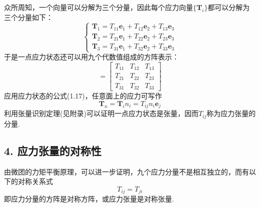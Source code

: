 众所周知，一个向量可以分解为三个分量，因此每个应力向量$\{\boldsymbol{T}_i\}$都可以分解为三个分量如下：
\begin{equation*}
\begin{cases}
\boldsymbol{T}_1=T_{11}\boldsymbol{e}_1+T_{12}\boldsymbol{e}_2+T_{13}\boldsymbol{e}_3\\
\boldsymbol{T}_2=T_{21}\boldsymbol{e}_1+T_{22}\boldsymbol{e}_2+T_{23}\boldsymbol{e}_3\\
\boldsymbol{T}_3=T_{31}\boldsymbol{e}_1+T_{32}\boldsymbol{e}_2+T_{33}\boldsymbol{e}_3
\end{cases}
\tag{1.17}
\end{equation*}
于是一点应力状态还可以用九个代数值组成的方阵表示：
\begin{equation*}
[T_{ij}]=\begin{bmatrix}
T_{11} & T_{12} & T_{13}\\
T_{21} & T_{22} & T_{23}\\
T_{31} & T_{32} & T_{33}
\end{bmatrix}
\tag{1.18a}
\end{equation*}
应用应力状态的公式(1.17)，任意面上的应力可写作
\begin{equation*}
\boldsymbol{T}_n=\boldsymbol{T}_i n_i=T_{ij}n_i\boldsymbol{e}_j
\tag{1.18b}
\end{equation*}
利用张量识别定理(见附录)可以证明一点应力状态是张量，因而$T_{ij}$称为应力张量的分量.

\subsection*{4. 应力张量的对称性}

由微团的力矩平衡原理，可以进一步证明，九个应力分量不是相互独立的，而有以下的对称关系式
\begin{equation*}
T_{ij}=T_{ji}
\tag{1.19}
\end{equation*}
即应力分量的方阵是对称方阵，或应力张量是对称张量.

